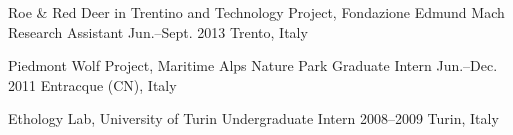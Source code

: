 \begin{cventries}
  \cventry
    {Roe \& Red Deer in Trentino and Technology Project, Fondazione Edmund Mach} %
    {Research Assistant} %
    {Jun.--Sept. 2013} %
    {Trento, Italy} %
    {
    }

  \cventry
    {Piedmont Wolf Project, Maritime Alps Nature Park} %
    {Graduate Intern} %
    {Jun.--Dec. 2011} %
    {Entracque (CN), Italy} %
    {
    }

  \cventry
    {Ethology Lab, University of Turin} %
    {Undergraduate Intern} %
    {2008--2009} %
    {Turin, Italy} %
    {
    }

\end{cventries}
